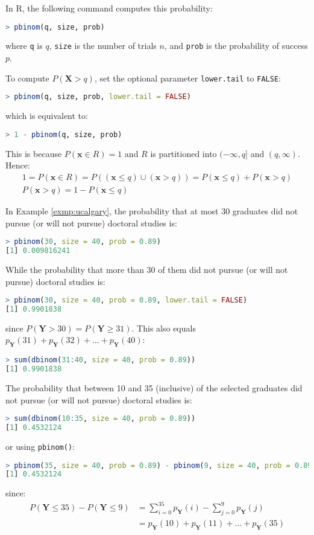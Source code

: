 In R, the following command computes this probability:
\begin{lstlisting}[language=R]
> pbinom(q, size, prob)
\end{lstlisting}
where \verb|q| is \( q \), \verb|size| is the number of trials \( n \), and \verb|prob| is the probability of success \( p \).

To compute \( P(\bm{X} > q) \), set the optional parameter \verb|lower.tail| to \verb|FALSE|:
\begin{lstlisting}[language=R]
> pbinom(q, size, prob, lower.tail = FALSE)
\end{lstlisting}
which is equivalent to:
\begin{lstlisting}[language=R]
> 1 - pbinom(q, size, prob)
\end{lstlisting}
This is because \( P(\bm{x} \in R) = 1 \) and \( R \) is partitioned into \( (-\infty, q] \) and \( (q, \infty) \).
Hence:
\begin{gather*}
    1 = P(\bm{x} \in R) = P((\bm{x} \leq q) \cup (\bm{x} > q)) = P(\bm{x} \leq q) + P(\bm{x} > q)\\
    P(\bm{x} > q) = 1 - P(\bm{x} \leq q)
\end{gather*}
\begin{exmp}
    In Example \autoref{exmp:ucalgary}, the probability that at most 30 graduates did not pursue (or will not pursue) doctoral studies is:
    \begin{lstlisting}[language=R]
> pbinom(30, size = 40, prob = 0.89)
[1] 0.009816241
    \end{lstlisting}
    While the probability that more than 30 of them did not pursue (or will not pursue) doctoral studies is:
    \begin{lstlisting}[language=R]
> pbinom(30, size = 40, prob = 0.89, lower.tail = FALSE)
[1] 0.9901838
    \end{lstlisting}
    since \( P(\bm{Y} > 30) = P(\bm{Y} \geq 31) \).
    This also equals \( p_{\bm{Y}}(31) + p_{\bm{Y}}(32) + \ldots + p_{\bm{Y}}(40) \):
    \begin{lstlisting}[language=R]
> sum(dbinom(31:40, size = 40, prob = 0.89))
[1] 0.9901838
    \end{lstlisting}
    The probability that between 10 and 35 (inclusive) of the selected graduates did not pursue (or will not pursue) doctoral studies is:
    \begin{lstlisting}[language=R]
> sum(dbinom(10:35, size = 40, prob = 0.89))
[1] 0.4532124
    \end{lstlisting}
    or using \verb|pbinom()|:
    \begin{lstlisting}[language=R]
> pbinom(35, size = 40, prob = 0.89) - pbinom(9, size = 40, prob = 0.89)
[1] 0.4532124
    \end{lstlisting}
    since:
    \begin{align*}
        P(\bm{Y} \leq 35) - P(\bm{Y} \leq 9) &= \sum_{i = 0}^{35} p_{\bm{Y}}(i) - \sum_{j = 0}^{9} p_{\bm{Y}}(j)\\
        &= p_{\bm{Y}}(10) + p_{\bm{Y}}(11) + \ldots + p_{\bm{Y}}(35)
    \end{align*}
\end{exmp}

